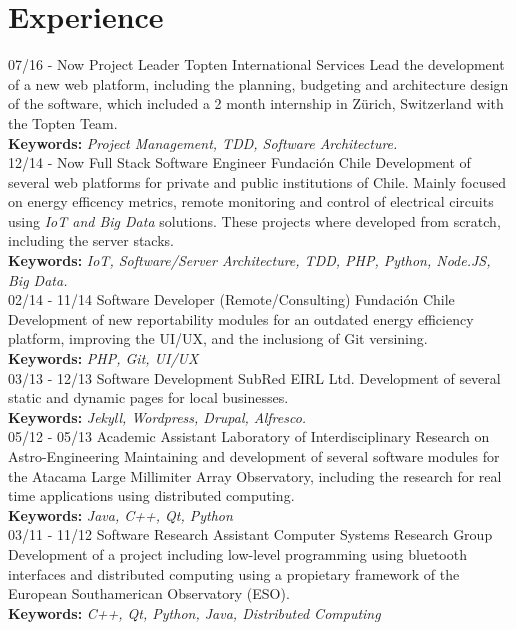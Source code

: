 \documentclass[]{friggeri-cv}
\begin{document}
\section{Experience}
\begin{entrylist}
  \entry
    {07/16 - Now}
    {Project Leader}
    {Topten International Services}
    {Lead the development of a new web platform, including the planning, budgeting and architecture design of the software, which included a 2 month internship in Zürich, Switzerland with the Topten Team.
    \\\textbf{Keywords:} \emph{Project Management, TDD, Software Architecture.}\\}
  \entry
    {12/14 - Now}
    {Full Stack Software Engineer}
    {Fundación Chile}
    {Development of several web platforms for private and public institutions of Chile. Mainly focused on energy efficency metrics, remote monitoring and control of electrical circuits using \emph{IoT and Big Data} solutions. These projects where developed from scratch, including the server stacks.
    \\\textbf{Keywords:} \emph{IoT, Software/Server Architecture, TDD, PHP, Python, Node.JS, Big Data.}\\}
  \entry
    {02/14 - 11/14}
    {Software Developer (Remote/Consulting)}
    {Fundación Chile}
    {Development of new reportability modules for an outdated energy efficiency platform, improving the UI/UX, and the inclusiong of Git versining.
    \\\textbf{Keywords:} \emph{PHP, Git, UI/UX}\\}
  \entry
    {03/13 - 12/13}
    {Software Development}
    {SubRed EIRL Ltd.}
    {Development of several static and dynamic pages for local businesses.
    \\\textbf{Keywords:} \emph{Jekyll, Wordpress, Drupal, Alfresco.}\\}
  \entry
    {05/12 - 05/13}
    {Academic Assistant}
    {Laboratory of Interdisciplinary Research on Astro-Engineering}
    {Maintaining and development of several software modules for the Atacama Large Millimiter Array Observatory, including the research for real time applications using distributed computing.
    \\\textbf{Keywords:} \emph{Java, C++, Qt, Python}\\}
  \entry
    {03/11 - 11/12}
    {Software Research Assistant}
    {Computer Systems Research Group}
    {Development of a project including low-level programming using bluetooth interfaces and distributed computing using a propietary framework of the European Southamerican Observatory (ESO).
    \\\textbf{Keywords:} \emph{C++, Qt, Python, Java, Distributed Computing}\\}
\end{entrylist}
\\
\end{document}
